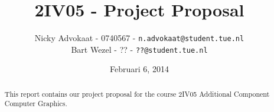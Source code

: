 \documentclass[a4paper,twoside,11pt]{article}
\title{\vspace{-\baselineskip}\sffamily\bfseries 2IV05 - Project Proposal}
\author{
Nicky Advokaat - 0740567 - {\tt n.advokaat@student.tue.nl} \\
Bart Wezel - ?? - {\tt ??@student.tue.nl}\\
}
\date{Februari 6, 2014}
\numberwithin{equation}{section}
\begin{document}
\maketitle
\thispagestyle{empty}
\begin{abstract}
This report contains our project proposal  for the course 2IV05 Additional Component Computer Graphics.
\end{abstract}






\end{document}
